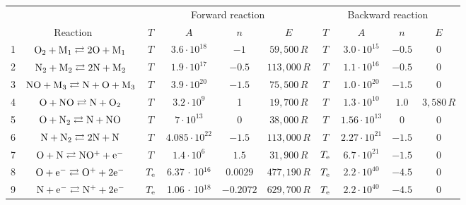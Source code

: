 \documentclass{warpdoc}
\renewcommand{\fontsizetable}{\footnotesize\scalefont{0.9}}
\begin{document}
%
\begin{table}[t]
\fontsizetable
\begin{center}
\begin{threeparttable}
\begin{tabular}{cccccccccc} 
\toprule
~&~&\multicolumn{4}{c}{Forward reaction} & \multicolumn{4}{c}{Backward reaction} \\
 \cmidrule(lr){3-6}\cmidrule(lr){7-10}
\multicolumn{2}{c}{Reaction} & $T$ & $A$ & $n$ & $E$ & $T$  & $A$ & $n$ & $E$ \\ 
\midrule
1 & $\rm O_2 + M_1 \rightleftarrows 2O+M_1$ &$T$ & $3.6 \cdot 10^{18}$  & $-1$    & $59,500 \, R$  
                                          &$T$  & $3.0 \cdot 10^{15}$  & $-0.5$  & 0\\
2 & $\rm N_2 + M_2 \rightleftarrows 2N+M_2$ &$T$  & $1.9 \cdot 10^{17}$ & $-0.5$ & $113,000 \, R$ 
                                          &$T$  & $1.1 \cdot 10^{16}$  & $-0.5$  & 0\\
3 & $\rm NO + M_3 \rightleftarrows N+O+M_3$ &$T$  & $3.9 \cdot 10^{20}$ & $-1.5$ & $75,500\, R$ 
                                          &$T$ & $1.0 \cdot 10^{20}$  & $-1.5$  & 0\\
4 & $\rm O + NO \rightleftarrows N+O_2$ &$T$ & $3.2 \cdot 10^{9}$ & 1 & $19,700 \, R$ 
                                          &$T$ & $1.3 \cdot 10^{10}$  & $1.0$  & $3,580 \, R$\\
5 & $\rm O + N_2 \rightleftarrows N+NO$ &$T$ & $7 \cdot 10^{13}$ & 0 & $38,000\, R$ 
                                          &$T$ & $1.56 \cdot 10^{13}$  & $0$  & 0\\
6 & $\rm N + N_2 \rightleftarrows 2N+N$ &$T$ & $4.085 \cdot 10^{22}$ & $-1.5$ & $113,000\, R$ 
                                          &$T$ & $2.27 \cdot 10^{21}$  & $-1.5$  & 0\\
7 & $\rm O + N \rightleftarrows NO^{+}+e^{-}$ &$T$ & $1.4 \cdot 10^{6}$ & $1.5$ & $31,900\, R$ 
                                          &$T_{\rm e}$ & $6.7 \cdot 10^{21}$  & $-1.5$  & 0\\
8 & $\rm O + e^- \rightleftarrows O^++2e^-$ &$T_{\rm e}$ & 6.37 $\cdot$ 10$^{16}$ & $0.0029$ & $477,190\, R$ 
                                          &$T_{\rm e}$ & $2.2 \cdot 10^{40}$  & $-4.5$  & 0\\
9 & $\rm N + e^- \rightleftarrows N^++2e^-$ &$T_{\rm e}$ & 1.06 $\cdot$ 10$^{18}$ & $-0.2072$ & $629,700\, R$ 
                                          &$T_{\rm e}$ & $2.2 \cdot 10^{40}$  & $-4.5$  & 0\\

\end{tabular}
\end{threeparttable}
\end{center}
\end{table}
\end{document}
